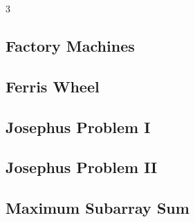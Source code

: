 \documentclass[8pt]{extarticle}
\begin{document}
\begin{multicols*}{3}
\subsection{Factory Machines}
\begin{caixaenunciado}

\end{caixaenunciado}
\vspace{0.3cm}


\subsection{Ferris Wheel}
\begin{caixaenunciado}

\end{caixaenunciado}
\vspace{0.3cm}


\subsection{Josephus Problem I}
\begin{caixaenunciado}

\end{caixaenunciado}
\vspace{0.3cm}


\subsection{Josephus Problem II}
\begin{caixaenunciado}

\end{caixaenunciado}
\vspace{0.3cm}


\subsection{Maximum Subarray Sum}
\begin{caixaenunciado}

\end{caixaenunciado}
\vspace{0.3cm}



\end{multicols*}
\end{document}
